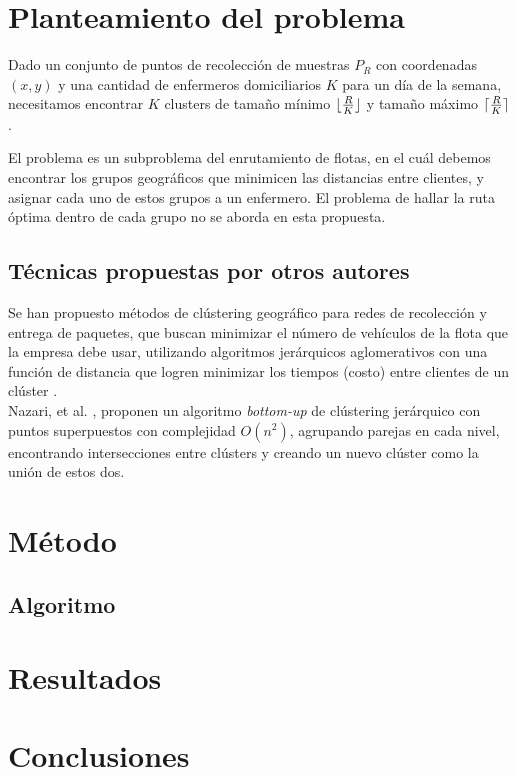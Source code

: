 \documentclass[runningheads]{llncs}
\DeclarePairedDelimiter{\ceil}{\lceil}{\rceil}
\DeclarePairedDelimiter{\floor}{\lfloor}{\rfloor}
\begin{document}
\section{Planteamiento del problema}
Dado un conjunto de puntos de recolección de muestras $P_{R}$ con coordenadas
$(x, y)$ y una cantidad de enfermeros domiciliarios $K$ para un día de la semana,
necesitamos encontrar $K$ clusters de tamaño mínimo $\floor{\frac{R}{K}}$ y tamaño
máximo $\ceil{\frac{R}{K}}$.

El problema es un subproblema del enrutamiento de flotas, en el cuál debemos encontrar
los grupos geográficos que minimicen las distancias entre clientes, y asignar cada uno
de estos grupos a un enfermero. El problema de hallar la ruta óptima dentro de cada
grupo no se aborda en esta propuesta.
\subsection{Técnicas propuestas por otros autores}
Se han propuesto métodos de clústering geográfico para redes de recolección y entrega
de paquetes, que buscan minimizar el número de vehículos de la flota que
la empresa debe usar, utilizando algoritmos jerárquicos aglomerativos con una función
de distancia que logren minimizar los tiempos (costo) entre clientes de un clúster
\cite{bard11}.
\\
Nazari, et al. \cite{nazari19}, proponen un algoritmo \textit{bottom-up} de clústering
jerárquico con puntos superpuestos con complejidad $O(n^{2})$, agrupando parejas en cada nivel,
encontrando intersecciones entre clústers y creando un nuevo clúster como la unión de estos dos.
\section{Método}
\subsection{Algoritmo}
\section{Resultados}
\section{Conclusiones}
%
%
%
\renewcommand{\refname}{Referencias}


\end{document}
